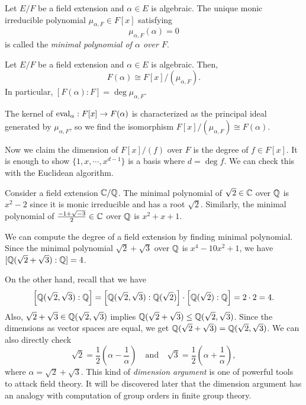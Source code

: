 \documentclass{../exp}
\begin{document}
\begin{defn}
Let $E/F$ be a field extension and $\alpha\in E$ is algebraic.
The unique monic irreducible polynomial $\mu_{\alpha,F}\in F[x]$ satisfying 
\[\mu_{\alpha,F}(\alpha)=0\]
is called the \emph{minimal polynomial of $\alpha$ over $F$}.
\end{defn}
\begin{thm}
Let $E/F$ be a field extension and $\alpha\in E$ is algebraic.
Then,
\[F(\alpha)\cong F[x]/(\mu_{\alpha,F}).\]
In particular, $[F(\alpha):F]=\deg\mu_{\alpha,F}$.
\end{thm}
\begin{pf}
The kernel of $\eval_\alpha:F[x]\to F(\alpha)$ is characterized as the principal ideal generated by $\mu_{\alpha,F}$, so we find the isomorphism $F[x]/(\mu_{\alpha,F})\cong F(\alpha)$.

Now we claim the dimension of $F[x]/(f)$ over $F$ is the degree of $f\in F[x]$.
It is enough to show $\{1,x,\cdots,x^{d-1}\}$ is a basis where $d=\deg f$.
We can check this with the Euclidean algorithm.
\end{pf}


\begin{ex}
Consider a field extension $\mathbb{C}/\mathbb{Q}$.
The minimal polynomial of $\sqrt2\in\mathbb{C}$ over $\mathbb{Q}$ is $x^2-2$ since it is monic irreducible and has a root $\sqrt2$.
Similarly, the minimal polynomial of $\frac{-1+\sqrt{-3}}2\in\mathbb{C}$ over $\mathbb{Q}$ is $x^2+x+1$.
\end{ex}
\begin{ex}
We can compute the degree of a field extension by finding minimal polynomial.
Since the minimal polynomial $\sqrt2+\sqrt3$ over $\mathbb{Q}$ is $x^4-10x^2+1$, we have $[\mathbb{Q}(\sqrt2+\sqrt3):\mathbb{Q}]=4$.

On the other hand, recall that we have
\[\left[\mathbb{Q}(\sqrt2,\sqrt3):\mathbb{Q}\right]=\left[\mathbb{Q}(\sqrt2,\sqrt3):\mathbb{Q}(\sqrt2)\right]\cdot\left[\mathbb{Q}(\sqrt2):\mathbb{Q}\right]=2\cdot2=4.\]
Also, $\sqrt2+\sqrt3\in\mathbb{Q}(\sqrt2,\sqrt3)$ implies $\mathbb{Q}(\sqrt2+\sqrt3)\le\mathbb{Q}(\sqrt2,\sqrt3)$.
Since the dimensions as vector spaces are equal, we get $\mathbb{Q}(\sqrt2+\sqrt3)=\mathbb{Q}(\sqrt2,\sqrt3)$.
We can also directly check
\[\sqrt2=\frac12\left(\alpha-\frac1\alpha\right)\quad\text{and}\quad\sqrt3=\frac12\left(\alpha+\frac1\alpha\right),\]
where $\alpha=\sqrt2+\sqrt3$.
This kind of \emph{dimension argument} is one of powerful tools to attack field theory.
It will be discovered later that the dimension argument has an analogy with computation of group orders in finite group theory.
\end{ex}
\end{document}

